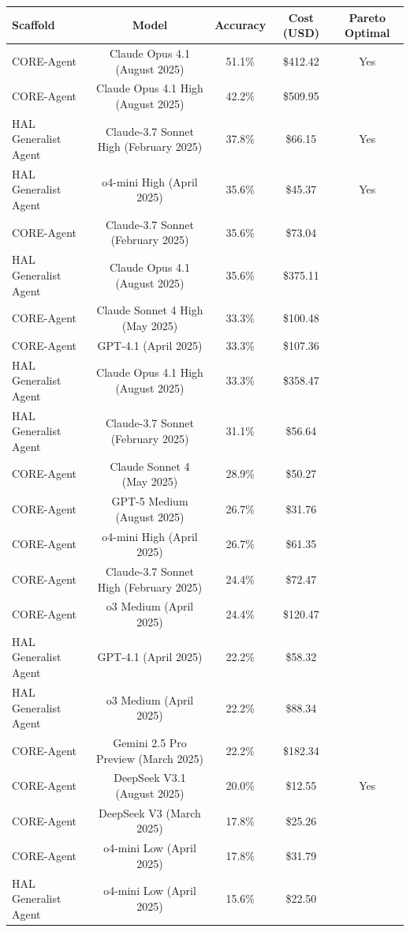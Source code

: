 \begin{tabular}{lcccc}
\toprule
Scaffold & Model & Accuracy & Cost (USD) & Pareto Optimal \\
\midrule
CORE-Agent & Claude Opus 4.1 (August 2025) & 51.1\% & \$412.42 & Yes \\
CORE-Agent & Claude Opus 4.1 High (August 2025) & 42.2\% & \$509.95 &  \\
HAL Generalist Agent & Claude-3.7 Sonnet High (February 2025) & 37.8\% & \$66.15 & Yes \\
HAL Generalist Agent & o4-mini High (April 2025) & 35.6\% & \$45.37 & Yes \\
CORE-Agent & Claude-3.7 Sonnet (February 2025) & 35.6\% & \$73.04 &  \\
HAL Generalist Agent & Claude Opus 4.1 (August 2025) & 35.6\% & \$375.11 &  \\
CORE-Agent & Claude Sonnet 4 High (May 2025) & 33.3\% & \$100.48 &  \\
CORE-Agent & GPT-4.1 (April 2025) & 33.3\% & \$107.36 &  \\
HAL Generalist Agent & Claude Opus 4.1 High (August 2025) & 33.3\% & \$358.47 &  \\
HAL Generalist Agent & Claude-3.7 Sonnet (February 2025) & 31.1\% & \$56.64 &  \\
CORE-Agent & Claude Sonnet 4 (May 2025) & 28.9\% & \$50.27 &  \\
CORE-Agent & GPT-5 Medium (August 2025) & 26.7\% & \$31.76 &  \\
CORE-Agent & o4-mini High (April 2025) & 26.7\% & \$61.35 &  \\
CORE-Agent & Claude-3.7 Sonnet High (February 2025) & 24.4\% & \$72.47 &  \\
CORE-Agent & o3 Medium (April 2025) & 24.4\% & \$120.47 &  \\
HAL Generalist Agent & GPT-4.1 (April 2025) & 22.2\% & \$58.32 &  \\
HAL Generalist Agent & o3 Medium (April 2025) & 22.2\% & \$88.34 &  \\
CORE-Agent & Gemini 2.5 Pro Preview (March 2025) & 22.2\% & \$182.34 &  \\
CORE-Agent & DeepSeek V3.1 (August 2025) & 20.0\% & \$12.55 & Yes \\
CORE-Agent & DeepSeek V3 (March 2025) & 17.8\% & \$25.26 &  \\
CORE-Agent & o4-mini Low (April 2025) & 17.8\% & \$31.79 &  \\
HAL Generalist Agent & o4-mini Low (April 2025) & 15.6\% & \$22.50 &  \\

\end{tabular}
